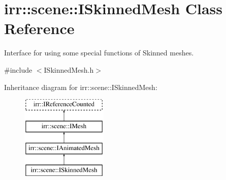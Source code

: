 \hypertarget{classirr_1_1scene_1_1ISkinnedMesh}{}\section{irr\+:\+:scene\+:\+:I\+Skinned\+Mesh Class Reference}
\label{classirr_1_1scene_1_1ISkinnedMesh}


Interface for using some special functions of Skinned meshes.  




{\ttfamily \#include $<$I\+Skinned\+Mesh.\+h$>$}

Inheritance diagram for irr\+:\+:scene\+:\+:I\+Skinned\+Mesh\+:\begin{figure}[H]
\begin{center}
\leavevmode
\includegraphics[height=4.000000cm]{classirr_1_1scene_1_1ISkinnedMesh}
\end{center}
\end{figure}
